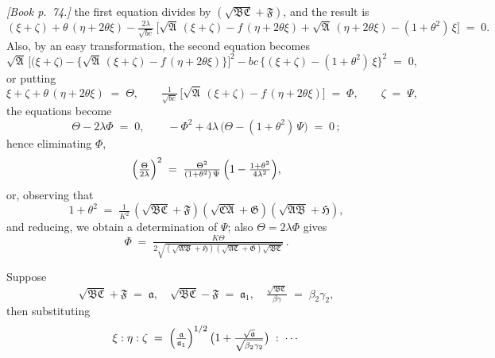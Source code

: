 \documentclass[11pt]{article}
\providecommand{\fA}{\mathfrak{A}}
\providecommand{\fB}{\mathfrak{B}}
\providecommand{\fC}{\mathfrak{C}}
\providecommand{\fF}{\mathfrak{F}}
\providecommand{\fG}{\mathfrak{G}}
\providecommand{\fH}{\mathfrak{H}}
\begin{document}
\bigskip

\noindent\emph{[Book p.~74.]} the first equation divides by $(\sqrt{\fB\fC} + \fF)$, and the result is
\[
(\xi + \zeta) + \theta\,(\eta + 2\theta\xi) - \tfrac{2\lambda}{\sqrt{bc}}\,\bigl[\sqrt{\fA}\,(\xi + \zeta) - f\,(\eta + 2\theta\xi) + \sqrt{\fA}\,(\eta + 2\theta\xi) - (1 + \theta^{2})\,\xi\bigr] \;=\; 0.
\]
Also, by an easy transformation, the second equation becomes
\[
\sqrt{\fA}\,\bigl[\bigl(\xi + \zeta\bigr) - \bigl\{\sqrt{\fA}\,(\xi + \zeta) - f\,(\eta + 2\theta\xi)\bigr\}\bigr]^{2} - bc\,\bigl\{(\xi + \zeta) - (1 + \theta^{2})\,\xi\bigr\}^{2} \;=\; 0,
\]
or putting
\[
\xi + \zeta + \theta\,(\eta + 2\theta\xi) \;=\; \Theta,\qquad \tfrac{1}{\sqrt{bc}}\,\bigl[\sqrt{\fA}\,(\xi + \zeta) - f\,(\eta + 2\theta\xi)\bigr] \;=\; \Phi,\qquad \zeta \;=\; \Psi,
\]
the equations become
\[
\Theta - 2\lambda\Phi \;=\; 0,\qquad -\Phi^{2} + 4\lambda\,\bigl(\Theta - (1 + \theta^{2})\,\Psi\bigr) \;=\; 0\,;
\]
hence eliminating $\Phi$,
\[
\Bigl(\tfrac{\Theta}{2\lambda}\Bigr)^{2} \;=\; \tfrac{\Theta^{2}}{(1 + \theta^{2})\,\Psi}\,\Bigl(1 - \tfrac{1 + \theta^{2}}{4\lambda^{2}}\Bigr),
\]
or, observing that
\[
1 + \theta^{2} \;=\; \tfrac{1}{K^{2}}\,(\sqrt{\fB\fC} + \fF)(\sqrt{\fC\fA} + \fG)(\sqrt{\fA\fB} + \fH),
\]
and reducing, we obtain a determination of $\Psi$; also $\Theta = 2\lambda\Phi$ gives
\[
\Phi \;=\; \tfrac{K\Theta}{2\sqrt{(\sqrt{\fA\fB} + \fH)(\sqrt{\fA\fC} + \fG)\sqrt{\fB\fC}}}\,.
\]

Suppose
\[
\sqrt{\fB\fC} + \fF \;=\; \mathfrak{a},\quad \sqrt{\fB\fC} - \fF \;=\; \mathfrak{a}_{1},\quad \tfrac{\sqrt{\fB\fC}}{\beta\gamma} \;=\; \beta_{2}\gamma_{2},
\]
then substituting
\[
\xi : \eta : \zeta \;=\; \Bigl(\tfrac{\mathfrak{a}}{\mathfrak{a}_{1}}\Bigr)^{1/2}\,\bigl(1 + \tfrac{\sqrt{\mathfrak{a}}}{\sqrt{\beta_{2}\gamma_{2}}}\bigr) \;:\; \cdots
\]

\bigskip
\end{document}
